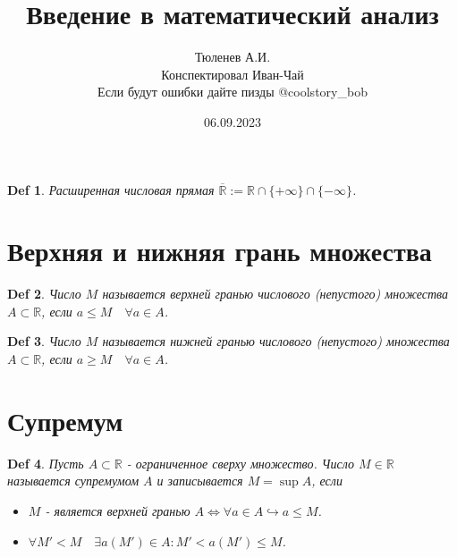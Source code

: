\documentclass[a5paper, 10pt]{article}
\theoremstyle{plain}
\newtheorem{definition}{Def}
\newcommand{\R}{\mathbb R}
\newcommand{\hrarrow}{\hookrightarrow}
\newcommand{\Lrarrow}{\Leftrightarrow}
\begin{document}
    \author{
        Тюленев А.И.\\
        Конспектировал Иван-Чай\\
        Если будут ошибки дайте пизды @coolstory\_bob}
    \date{06.09.2023}
    \title{Введение в математический анализ}

    \linespread{1.4}
    \selectfont

    \maketitle
    \newpage

    \tableofcontents

    \begin{definition}
        Расширенная числовая прямая
        $ \overline{\R} := \R \cap \{+\infty\} \cap \{-\infty\} $.
    \end{definition}

    \section{Верхняя и нижняя грань множества}

    \begin{definition}
    Число $ M $ называется верхней гранью числового (непустого) множества $ A \subset \R $,
    если $ a \leq M \quad \forall a \in A $.
    \end{definition}

    \begin{definition}
    Число $ M $ называется нижней гранью числового (непустого) множества $ A \subset \R $,
    если $ a \geq M \quad \forall a \in A $.
    \end{definition}

    \section{Супремум}

    \begin{definition}
    Пусть $ A \subset \R $ - ограниченное сверху множество. Число $ M \in \R $ называется
    супремумом $ A $ и записывается $ M = \sup A $, если

    \begin{itemize}
        \item $ M $ - является верхней гранью $ A \Lrarrow \forall a \in A \hrarrow a \leq M $.
        \item $ \forall M' < M \quad \exists a(M') \in A : M' < a(M') \leq M $.
    \end{itemize}
    \end{definition}
\end{document}
